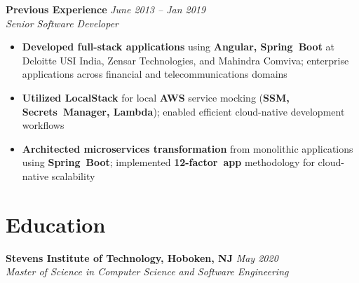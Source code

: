 \documentclass[11pt,a4paper]{article}
\newcommand{\resumeItem}[1]{\item\small{#1}}
\newcommand{\resumeItemList}[1]{\begin{itemize}[leftmargin=0.5in, itemsep=0.25em, parsep=0pt, partopsep=0pt, topsep=0.25em]
    \small
    #1
\end{itemize}}
\begin{document}
\textbf{Previous Experience} \hfill \textit{June 2013 -- Jan 2019}\\
\textit{Senior Software Developer}
\resumeItemList{
    \resumeItem{\textbf{Developed full-stack applications} using \textbf{Angular, Spring~Boot} at Deloitte USI India, Zensar Technologies, and Mahindra Comviva; enterprise applications across financial and telecommunications domains}
    \resumeItem{\textbf{Utilized \textbf{LocalStack}} for local \textbf{AWS} service mocking (\textbf{SSM, Secrets~Manager, Lambda}); enabled efficient cloud-native development workflows}
    \resumeItem{\textbf{Architected microservices transformation} from monolithic applications using \textbf{Spring~Boot}; implemented \textbf{12-factor~app} methodology for cloud-native scalability}
}

\section{Education}
\textbf{Stevens Institute of Technology, Hoboken, NJ} \hfill \textit{May 2020}\\
\textit{Master of Science in Computer Science and Software Engineering}
\end{document}

